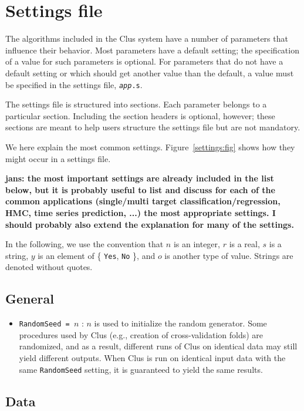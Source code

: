 \chapter{Settings file}

The algorithms included in the Clus system have a number of parameters that influence their behavior.  Most parameters have a default setting; the specification of a value for such parameters is optional.  For parameters that do not have a default setting or which should get another value than the default, a value must be specified in the settings file, {\tt {\em app}.s}.

The settings file is structured into sections.  Each parameter belongs to a particular section.  Including the section headers is optional, however; these sections are meant to help users structure the settings file but are not mandatory.

We here explain the most common settings.  Figure~\ref{settings:fig} shows how they might occur in a settings file.

{\bf * jans: the most important settings are already included in the list below, but it is probably useful to list and discuss for each of the common applications (single/multi target classification/regression, HMC, time series prediction, ...) the most appropriate settings. I should probably also extend the explanation for many of the settings.}

In the following, we use the convention that $n$ is an integer, $r$ is a real, $s$ is a string, $y$ is an element of \{ {\tt Yes}, {\tt No} \}, and $o$ is another type of value.  Strings are denoted without quotes.

\section{General}

\begin{itemize}
\item {\tt RandomSeed = $n$} : $n$ is used to initialize the random generator.
Some procedures used by Clus (e.g., creation of cross-validation folds) are randomized, and as a result, different runs of Clus on identical data may still yield different outputs.  When Clus is run on identical input data with the same {\tt RandomSeed} setting, it is guaranteed to yield the same results.
\end{itemize}

\section{Data}

